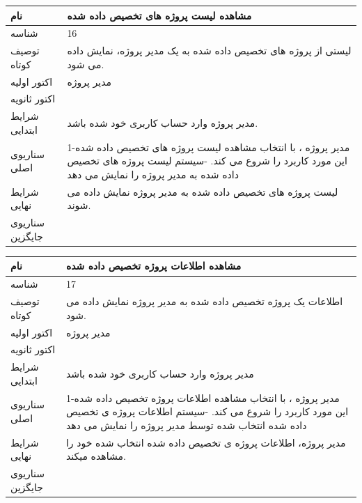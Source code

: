 \begin{tabular}{|p{2cm}|p{10cm}|}
\hline
نام
&
مشاهده  لیست پروژه های تخصیص داده شده
\\
\hline
شناسه
&
16
\\
\hline
توصیف کوتاه
&
لیستی از پروژه های تخصیص داده شده به یک مدیر پروژه، نمایش داده می شود.
\\
\hline
اکتور اولیه
&
مدیر پروژه
\\
\hline
اکتور ثانویه
&

\\
\hline
شرایط ابتدایی
&
مدیر پروژه وارد حساب کاربری خود شده باشد. 
\\
\hline
سناریوی اصلی
&
1-مدیر پروژه ، با انتخاب مشاهده  لیست پروژه های تخصیص داده شده  این مورد کاربرد را شروع می کند.
\newline
2-سیستم لیست پروژه های تخصیص داده شده به مدیر پروژه را نمایش می دهد
\\
\hline
شرایط نهایی
&
لیست پروژه های تخصیص داده شده به مدیر پروژه نمایش داده می شوند.
\\
\hline
سناریوی جایگزین
&

\\
\hline
\end{tabular}

\vspace{2cm}

\begin{tabular}{|p{2cm}|p{10cm}|}
\hline
نام
&
مشاهده اطلاعات پروژه تخصیص داده شده
\\
\hline
شناسه
&
17
\\
\hline
توصیف کوتاه
&
اطلاعات یک پروژه  تخصیص داده شده به مدیر پروژه نمایش داده می شود.
\\
\hline
اکتور اولیه
&
مدیر پروژه
\\
\hline
اکتور ثانویه
&

\\
\hline
شرایط ابتدایی
&
مدیر پروژه وارد حساب کاربری خود شده باشد
\\
\hline
سناریوی اصلی
&
1-مدیر پروژه ، با انتخاب مشاهده اطلاعات پروژه  تخصیص داده شده این مورد کاربرد را شروع می کند.
\newline
2-سیستم اطلاعات پروژه ی تخصیص داده شده انتخاب شده  توسط مدیر پروژه را نمایش می دهد

\\
\hline
شرایط نهایی
&
مدیر پروژه، اطلاعات پروژه ی تخصیص داده شده انتخاب شده  خود را مشاهده میکند.
\\
\hline
سناریوی جایگزین
&

\\
\hline
\end{tabular}

